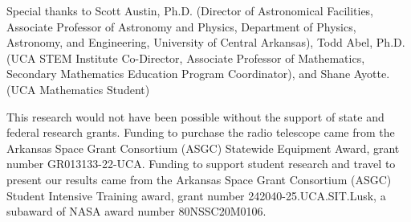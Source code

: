 \noindent Special thanks to Scott Austin, Ph.D. (Director of Astronomical Facilities, Associate Professor of Astronomy and Physics, Department of Physics, Astronomy, and Engineering, University of Central Arkansas), Todd Abel, Ph.D. (UCA STEM Institute Co-Director, Associate Professor of Mathematics, Secondary Mathematics Education Program Coordinator), and Shane Ayotte. (UCA Mathematics Student)

This research would not have been possible without the support of state and federal research grants. Funding to purchase the radio telescope came from the Arkansas Space Grant Consortium (ASGC) Statewide Equipment Award, grant number GR013133-22-UCA. Funding to support student research and travel to present our results came from the Arkansas Space Grant Consortium (ASGC) Student Intensive Training award, grant number 242040-25.UCA.SIT.Lusk, a subaward of NASA award number 80NSSC20M0106.
